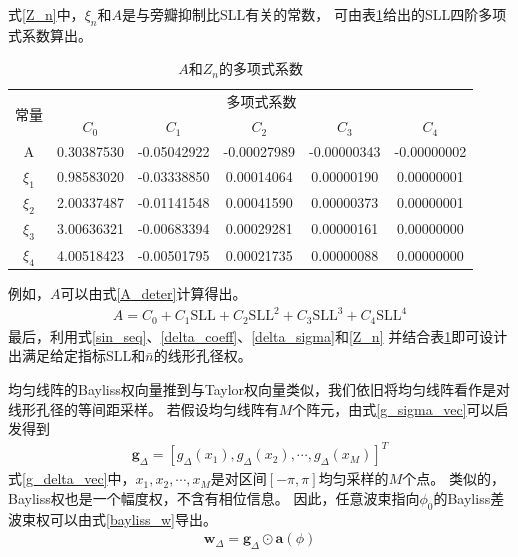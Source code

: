 \documentclass[master]{thesis-uestc}
\begin{document}
式\eqref{Z_n}中，$\xi_n$和$A$是与旁瓣抑制比SLL有关的常数，
可由表\ref{Z_n_coeff_tab}给出的SLL四阶多项式系数算出。
\begin{table}[h]
    \caption{$A$和$Z_n$的多项式系数}
    \begin{tabular}{|c|c|c|c|c|c|}
    \hline
    \multirow{2}{*}{常量}  & \multicolumn{5}{|c|}{多项式系数}  \\
    \cline{2-6}
    & $C_0$ & $C_1$ & $C_2$ & $C_3$ & $C_4$ \\
    \cline{1-6}
    A & 0.30387530 & -0.05042922 & -0.00027989 & -0.00000343 & -0.00000002 \\
    \cline{1-6}
    $\xi_1$ & 0.98583020 & -0.03338850 & 0.00014064 & 0.00000190 & 0.00000001 \\
    \cline{1-6}
    $\xi_2$ & 2.00337487 & -0.01141548 & 0.00041590 & 0.00000373 & 0.00000001 \\
    \cline{1-6}
    $\xi_3$ & 3.00636321 & -0.00683394 & 0.00029281 & 0.00000161 & 0.00000000 \\
    \cline{1-6}
    $\xi_4$ & 4.00518423 & -0.00501795 & 0.00021735 & 0.00000088 & 0.00000000 \\
    \hline
    \end{tabular}
    \label{Z_n_coeff_tab}
\end{table}

例如，$A$可以由式\eqref{A_deter}计算得出。
\begin{equation}\label{A_deter}
    \begin{aligned}
        A = C_0 + C_1\text{SLL} + C_2\text{SLL}^2 + C_3\text{SLL}^3 + C_4\text{SLL}^4
    \end{aligned}
\end{equation}
最后，利用式\eqref{sin_seq}、\eqref{delta_coeff}、\eqref{delta_sigma}和\eqref{Z_n}
并结合表\ref{Z_n_coeff_tab}即可设计出满足给定指标SLL和$\bar{n}$的线形孔径权。

均匀线阵的Bayliss权向量推到与Taylor权向量类似，我们依旧将均匀线阵看作是对线形孔径的等间距采样。
若假设均匀线阵有$M$个阵元，由式\eqref{g_sigma_vec}可以启发得到
\begin{equation}\label{g_delta_vec}
    \begin{aligned}
        \bm{g}_{\Delta}=\left[g_{\Delta}\left(x_{1}\right), 
        g_{\Delta}\left(x_{2}\right), \cdots, g_{\Delta}\left(x_{M}\right)\right]^{T}
    \end{aligned}
\end{equation}
式\eqref{g_delta_vec}中，$x_1,x_2,\cdots,x_M$是对区间$\left[-\pi,\pi\right]$均匀采样的$M$个点。
类似的，Bayliss权也是一个幅度权，不含有相位信息。
因此，任意波束指向$\phi_0$的Bayliss差波束权可以由式\eqref{bayliss_w}导出。
\begin{equation}\label{bayliss_w}
    \begin{aligned}
        \bm{w}_\Delta = \bm{g}_\Delta \odot \bm{a}(\phi)
    \end{aligned}
\end{equation}
\end{document}
